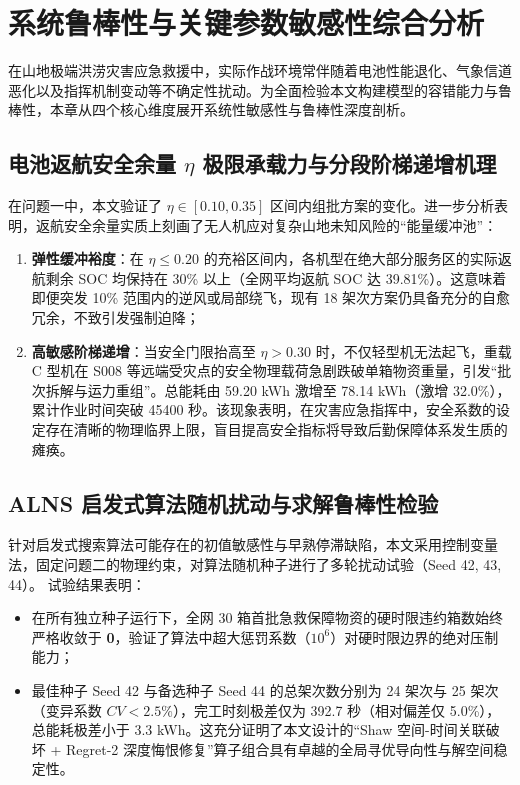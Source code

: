 \section{系统鲁棒性与关键参数敏感性综合分析}

在山地极端洪涝灾害应急救援中，实际作战环境常伴随着电池性能退化、气象信道恶化以及指挥机制变动等不确定性扰动。为全面检验本文构建模型的容错能力与鲁棒性，本章从四个核心维度展开系统性敏感性与鲁棒性深度剖析。

\subsection{电池返航安全余量 $\eta$ 极限承载力与分段阶梯递增机理}

在问题一中，本文验证了 $\eta \in [0.10, 0.35]$ 区间内组批方案的变化。进一步分析表明，返航安全余量实质上刻画了无人机应对复杂山地未知风险的“能量缓冲池”：
\begin{enumerate}
    \item \textbf{弹性缓冲裕度}：在 $\eta \le 0.20$ 的充裕区间内，各机型在绝大部分服务区的实际返航剩余 SOC 均保持在 30\% 以上（全网平均返航 SOC 达 39.81\%）。这意味着即便突发 10\% 范围内的逆风或局部绕飞，现有 18 架次方案仍具备充分的自愈冗余，不致引发强制迫降；
    \item \textbf{高敏感阶梯递增}：当安全门限抬高至 $\eta > 0.30$ 时，不仅轻型机无法起飞，重载 C 型机在 S008 等远端受灾点的安全物理载荷急剧跌破单箱物资重量，引发“批次拆解与运力重组”。总能耗由 59.20 kWh 激增至 78.14 kWh（激增 32.0\%），累计作业时间突破 45400 秒。该现象表明，在灾害应急指挥中，安全系数的设定存在清晰的物理临界上限，盲目提高安全指标将导致后勤保障体系发生质的瘫痪。
\end{enumerate}

\subsection{ALNS 启发式算法随机扰动与求解鲁棒性检验}

针对启发式搜索算法可能存在的初值敏感性与早熟停滞缺陷，本文采用控制变量法，固定问题二的物理约束，对算法随机种子进行了多轮扰动试验（Seed 42, 43, 44）。
试验结果表明：
\begin{itemize}
    \item 在所有独立种子运行下，全网 30 箱首批急救保障物资的硬时限违约箱数始终严格收敛于 \textbf{0}，验证了算法中超大惩罚系数（$10^6$）对硬时限边界的绝对压制能力；
    \item 最佳种子 Seed 42 与备选种子 Seed 44 的总架次数分别为 24 架次与 25 架次（变异系数 $CV < 2.5\%$），完工时刻极差仅为 392.7 秒（相对偏差仅 5.0\%），总能耗极差小于 3.3 kWh。这充分证明了本文设计的“Shaw 空间-时间关联破坏 + Regret-2 深度悔恨修复”算子组合具有卓越的全局寻优导向性与解空间稳定性。
\end{itemize}

